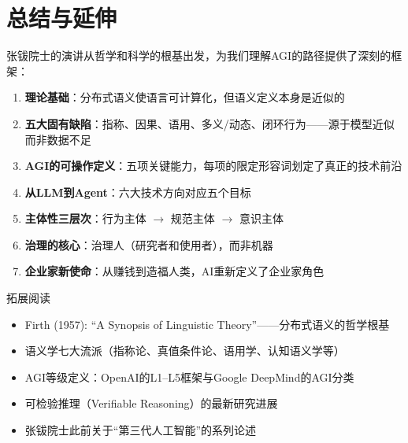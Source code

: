 \section{总结与延伸}

张钹院士的演讲从哲学和科学的根基出发，为我们理解AGI的路径提供了深刻的框架：

\begin{enumerate}
\item \textbf{理论基础}：分布式语义使语言可计算化，但语义定义本身是近似的
\item \textbf{五大固有缺陷}：指称、因果、语用、多义/动态、闭环行为——源于模型近似而非数据不足
\item \textbf{AGI的可操作定义}：五项关键能力，每项的限定形容词划定了真正的技术前沿
\item \textbf{从LLM到Agent}：六大技术方向对应五个目标
\item \textbf{主体性三层次}：行为主体 $\rightarrow$ 规范主体 $\rightarrow$ 意识主体
\item \textbf{治理的核心}：治理人（研究者和使用者），而非机器
\item \textbf{企业家新使命}：从赚钱到造福人类，AI重新定义了企业家角色
\end{enumerate}

\begin{knowledgebox}{拓展阅读}
\begin{itemize}
\item Firth (1957): ``A Synopsis of Linguistic Theory''——分布式语义的哲学根基
\item 语义学七大流派（指称论、真值条件论、语用学、认知语义学等）
\item AGI等级定义：OpenAI的L1--L5框架与Google DeepMind的AGI分类
\item 可检验推理（Verifiable Reasoning）的最新研究进展
\item 张钹院士此前关于``第三代人工智能''的系列论述
\end{itemize}
\end{knowledgebox}



